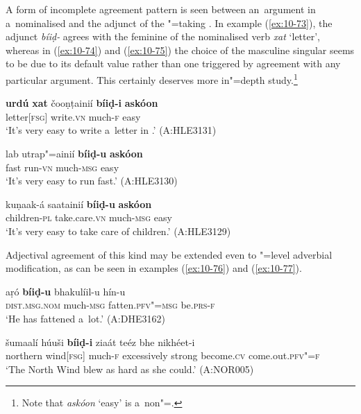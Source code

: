 A form of incomplete agreement pattern is seen between an~argument in a~nominalised  and the adjunct of the "=taking . In example (\ref{ex:10-73}), the adjunct \textit{bíiḍ-} agrees with the feminine  of the nominalised verb \textit{xat} `letter', whereas in (\ref{ex:10-74}) and (\ref{ex:10-75}) the choice of the masculine singular seems to be due to its default value rather than one triggered by agreement with any particular argument. This certainly deserves more in"=depth study.\footnote{Note that \textit{askóon} `easy' is a~non"=.}

\begin{exe}
\ex
\label{ex:10-73}
\gll {\ob}\textbf{urdú} \textbf{xat}{\cb} čooṇṭainií {\ob}\textbf{bíiḍ-i} \textbf{askóon}{\cb} \\
\iliUrdu letter[\textsc{fsg}] write.\textsc{vn} much-\textsc{f} easy  \\
\glt `It's very easy to write a~letter in \iliUrdu.' (A:HLE3131)

\ex
\label{ex:10-74}
\gll lab utrap"=ainií {\ob}\textbf{bíiḍ-u} \textbf{askóon}{\cb} \\
fast run-\textsc{vn} much-\textsc{msg} easy \\
\glt `It's very easy to run fast.' (A:HLE3130)

\ex
\label{ex:10-75}
\gll kuṇaak-á saatainií {\ob}\textbf{bíiḍ-u} \textbf{askóon}{\cb} \\
children-\textsc{pl} take.care.\textsc{vn} much-\textsc{msg} easy \\
\glt `It's very easy to take care of children.' (A:HLE3129)
\end{exe}

Adjectival agreement of this kind may be extended even to "=level adverbial modification, as can be seen in examples (\ref{ex:10-76}) and (\ref{ex:10-77}).

\begin{exe}
\ex
\label{ex:10-76}
\gll aṛó \textbf{bíiḍ-u} bhakulíil-u hín-u\\
 \textsc{dist.msg.nom} much-\textsc{msg} fatten.\textsc{pfv"=msg} be.\textsc{prs-f} \\
\glt `He has fattened a~lot.' (A:DHE3162)

\ex
\label{ex:10-77}
\gll šumaalí húuši \textbf{bíiḍ-i} ziaát teéz bhe nikhéet-i\\
northern wind[\textsc{fsg}] much-\textsc{f} excessively strong become.\textsc{cv} come.out.\textsc{pfv"=f}\\
\glt `The North Wind blew as hard as she could.' (A:NOR005)
\end{exe}
